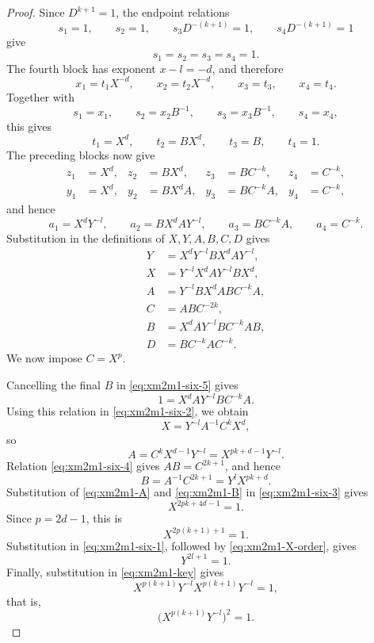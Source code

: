 \documentclass{article}
\begin{document}
\begin{proof}
Since $D^{k+1}=1$, the endpoint relations
\[
    s_1=1,\qquad s_2=1,\qquad
    s_3D^{-(k+1)}=1,\qquad s_4D^{-(k+1)}=1
\]
give
\[
    s_1=s_2=s_3=s_4=1.
\]
The fourth block has exponent $x-l=-d$, and therefore
\[
    x_1=t_1X^{-d},\qquad x_2=t_2X^{-d},\qquad
    x_3=t_3,\qquad x_4=t_4.
\]
Together with
\[
    s_1=x_1,\qquad s_2=x_2B^{-1},\qquad
    s_3=x_3B^{-1},\qquad s_4=x_4,
\]
this gives
\[
    t_1=X^d,\qquad t_2=BX^d,\qquad t_3=B,\qquad t_4=1.
\]
The preceding blocks now give
\[
\begin{aligned}
 z_1&=X^d,& z_2&=BX^d,& z_3&=BC^{-k},& z_4&=C^{-k},\\
 y_1&=X^d,& y_2&=BX^dA,& y_3&=BC^{-k}A,& y_4&=C^{-k},
\end{aligned}
\]
and hence
\[
    a_1=X^dY^{-l},\qquad
    a_2=BX^dAY^{-l},\qquad
    a_3=BC^{-k}A,\qquad
    a_4=C^{-k}.
\]
Substitution in the definitions of $X,Y,A,B,C,D$ gives
\begin{align}
Y&=X^dY^{-l}BX^dAY^{-l}, \label{eq:xm2m1-six-1}\\
X&=Y^{-l}X^dAY^{-l}BX^d, \label{eq:xm2m1-six-2}\\
A&=Y^{-l}BX^dABC^{-k}A, \label{eq:xm2m1-six-3}\\
C&=ABC^{-2k}, \label{eq:xm2m1-six-4}\\
B&=X^dAY^{-l}BC^{-k}AB, \label{eq:xm2m1-six-5}\\
D&=BC^{-k}AC^{-k}. \label{eq:xm2m1-six-6}
\end{align}
We now impose $C=X^p$.

Cancelling the final $B$ in \eqref{eq:xm2m1-six-5} gives
\begin{equation}
 1=X^dAY^{-l}BC^{-k}A.                 \label{eq:xm2m1-key}
\end{equation}
Using this relation in \eqref{eq:xm2m1-six-2}, we obtain
\[
 X=Y^{-l}A^{-1}C^kX^d,
\]
so
\begin{equation}
 A=C^kX^{d-1}Y^{-l}=X^{pk+d-1}Y^{-l}. \label{eq:xm2m1-A}
\end{equation}
Relation \eqref{eq:xm2m1-six-4} gives $AB=C^{2k+1}$, and hence
\begin{equation}
 B=A^{-1}C^{2k+1}=Y^lX^{pk+d}.          \label{eq:xm2m1-B}
\end{equation}
Substitution of \eqref{eq:xm2m1-A} and \eqref{eq:xm2m1-B} in
\eqref{eq:xm2m1-six-3} gives
\[
 X^{2pk+4d-1}=1.
\]
Since $p=2d-1$, this is
\begin{equation}
 X^{2p(k+1)+1}=1.                       \label{eq:xm2m1-X-order}
\end{equation}
Substitution in \eqref{eq:xm2m1-six-1}, followed by
\eqref{eq:xm2m1-X-order}, gives
\begin{equation}
 Y^{2l+1}=1.                             \label{eq:xm2m1-Y-order}
\end{equation}
Finally, substitution in \eqref{eq:xm2m1-key} gives
\[
 X^{p(k+1)}Y^{-l}X^{p(k+1)}Y^{-l}=1,
\]
that is,
\begin{equation}
 \bigl(X^{p(k+1)}Y^{-l}\bigr)^2=1.      \label{eq:xm2m1-square}
\end{equation}


\end{proof}
\end{document}
